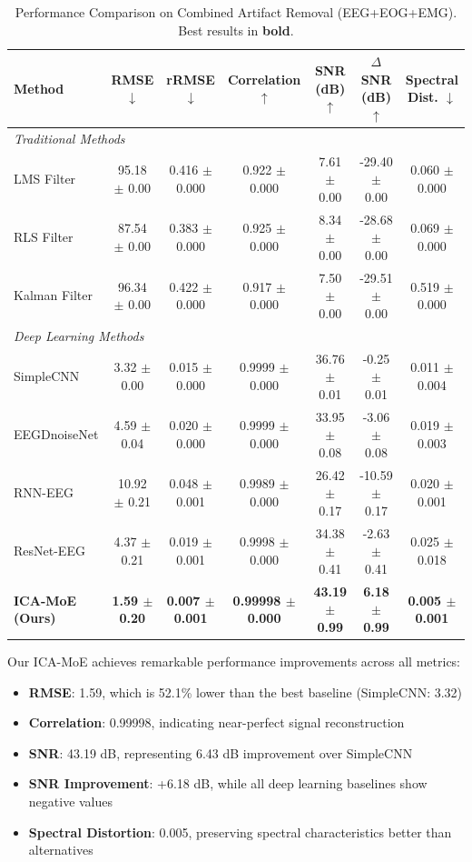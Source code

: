 \documentclass{article}
\begin{document}
\begin{table}[!t]
\centering
\caption{Performance Comparison on Combined Artifact Removal (EEG+EOG+EMG). Best results in \textbf{bold}.}
\label{tab:overall_results}
\begin{tabular}{lcccccc}
\toprule
\textbf{Method} & \textbf{RMSE} $\downarrow$ & \textbf{rRMSE} $\downarrow$ & \textbf{Correlation} $\uparrow$ & \textbf{SNR (dB)} $\uparrow$ & \textbf{$\Delta$SNR (dB)} $\uparrow$ & \textbf{Spectral Dist.} $\downarrow$ \\
\midrule
\multicolumn{7}{l}{\textit{Traditional Methods}} \\
LMS Filter & 95.18 $\pm$ 0.00 & 0.416 $\pm$ 0.000 & 0.922 $\pm$ 0.000 & 7.61 $\pm$ 0.00 & -29.40 $\pm$ 0.00 & 0.060 $\pm$ 0.000 \\
RLS Filter & 87.54 $\pm$ 0.00 & 0.383 $\pm$ 0.000 & 0.925 $\pm$ 0.000 & 8.34 $\pm$ 0.00 & -28.68 $\pm$ 0.00 & 0.069 $\pm$ 0.000 \\
Kalman Filter & 96.34 $\pm$ 0.00 & 0.422 $\pm$ 0.000 & 0.917 $\pm$ 0.000 & 7.50 $\pm$ 0.00 & -29.51 $\pm$ 0.00 & 0.519 $\pm$ 0.000 \\
\midrule
\multicolumn{7}{l}{\textit{Deep Learning Methods}} \\
SimpleCNN & 3.32 $\pm$ 0.00 & 0.015 $\pm$ 0.000 & 0.9999 $\pm$ 0.000 & 36.76 $\pm$ 0.01 & -0.25 $\pm$ 0.01 & 0.011 $\pm$ 0.004 \\
EEGDnoiseNet & 4.59 $\pm$ 0.04 & 0.020 $\pm$ 0.000 & 0.9999 $\pm$ 0.000 & 33.95 $\pm$ 0.08 & -3.06 $\pm$ 0.08 & 0.019 $\pm$ 0.003 \\
RNN-EEG & 10.92 $\pm$ 0.21 & 0.048 $\pm$ 0.001 & 0.9989 $\pm$ 0.000 & 26.42 $\pm$ 0.17 & -10.59 $\pm$ 0.17 & 0.020 $\pm$ 0.001 \\
ResNet-EEG & 4.37 $\pm$ 0.21 & 0.019 $\pm$ 0.001 & 0.9998 $\pm$ 0.000 & 34.38 $\pm$ 0.41 & -2.63 $\pm$ 0.41 & 0.025 $\pm$ 0.018 \\
\midrule
\textbf{ICA-MoE (Ours)} & \textbf{1.59 $\pm$ 0.20} & \textbf{0.007 $\pm$ 0.001} & \textbf{0.99998 $\pm$ 0.000} & \textbf{43.19 $\pm$ 0.99} & \textbf{6.18 $\pm$ 0.99} & \textbf{0.005 $\pm$ 0.001} \\
\bottomrule
\end{tabular}
\end{table}

Our ICA-MoE achieves remarkable performance improvements across all metrics:
\begin{itemize}
\item \textbf{RMSE}: 1.59, which is 52.1\% lower than the best baseline (SimpleCNN: 3.32)
\item \textbf{Correlation}: 0.99998, indicating near-perfect signal reconstruction
\item \textbf{SNR}: 43.19 dB, representing 6.43 dB improvement over SimpleCNN
\item \textbf{SNR Improvement}: +6.18 dB, while all deep learning baselines show negative values
\item \textbf{Spectral Distortion}: 0.005, preserving spectral characteristics better than alternatives
\end{itemize}
\end{document}
